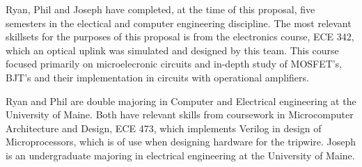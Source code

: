 
	
Ryan, Phil and Joseph have completed, at the time of this proposal, five semesters in the electical and computer engineering discipline. The most relevant skillsets for the purposes of this proposal is from the electronics course, ECE 342, which an optical uplink was simulated and designed by this team. This course focused primarily on microelecronic circuits and in-depth study of MOSFET's, BJT's and their implementation in circuits with operational amplifiers. 

Ryan and Phil are double majoring in Computer and Electrical engineering at the University of Maine. Both have relevant skills from coursework in Microcomputer Architecture and Design, ECE 473, which implements Verilog in design of Microprocessors, which is of use when designing hardware for the tripwire. Joseph is an
undergraduate majoring in electrical engineering at the University of Maine. 
